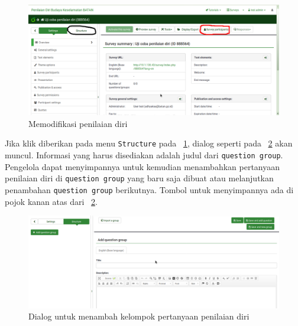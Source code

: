 \begin{figure}
  \begin{center}
    \includegraphics[scale=.4]{pics/proyekSurvey2.png}
    \caption{Memodifikasi penilaian diri}
    \label{fig:modifSurvey}
  \end{center}
\end{figure}

Jika klik diberikan pada menu \texttt{Structure} pada \figurename~\ref{fig:modifSurvey}, dialog seperti pada \figurename~\ref{fig:addGroupStructure} akan muncul. Informasi yang harus disediakan adalah judul dari \texttt{question group}. Pengelola dapat menyimpannya untuk kemudian menambahkan pertanyaan penilaian diri di \texttt{question group} yang baru saja dibuat atau melanjutkan penambahan \texttt{question group} berikutnya. Tombol untuk menyimpannya ada di pojok kanan atas dari \figurename~\ref{fig:addGroupStructure}.

\begin{figure}
  \begin{center}
    \includegraphics[scale=.35]{pics/addGroupStructure.png}
    \caption{Dialog untuk menambah kelompok pertanyaan penilaian diri}
    \label{fig:addGroupStructure}
  \end{center}
\end{figure}

